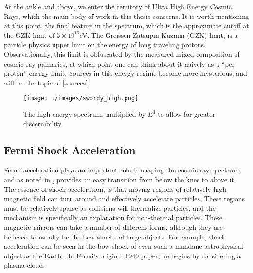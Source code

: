 At the ankle and above, we enter the territory of Ultra High Energy Cosmic Rays, which the main body of work in this thesis 
concerns. It is worth mentioning at this point, the final feature in the spectrum, which is the approximate cutoff at the GZK limit of $5\times10^{19}$eV. The Greissen-Zatsupin-Kuzmin (GZK) limit, is a particle physics upper limit on the energy of long traveling protons. Observationally, this limit is obfuscated by the measured mixed composition of cosmic ray primaries, at which point one can think about it naively as a ``per proton'' energy limit\cite{futuregzk}. Sources in this energy regime become more mysterious, and will be the topic of \autoref{sources}. 
\begin{figure}[h!]
\begin{center}
\texttt{[image: ./images/swordy\_high.png]}
\begin{singlespace}
\caption[High Energy All Particle Spectrum]{The high energy spectrum, multiplied by $E^3$ to allow for greater discernibility.}
\end{singlespace}
\label{swordyhigh}
\end{center}
\end{figure}
\subsection{Fermi Shock Acceleration}
\label{fermi}
Fermi acceleration plays an important role in shaping the cosmic ray spectrum, and as noted in \cite{crapp}, provides an easy transition from below the knee to above it. The essence of shock acceleration, is that moving regions of relatively high magnetic field can turn around and effectively accelerate particles. These regions must be relatively sparse as collisions will thermalize particles, and the mechanism is specifically an explanation for non-thermal particles. These magnetic mirrors can take a number of different forms, although they are believed to usually be the bow shocks of large objects. For example, shock acceleration can be seen in the bow shock of even such a mundane astrophysical object as the Earth \cite{shocks}. In Fermi's original 1949 paper, he begins by considering a plasma cloud.


